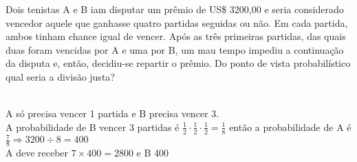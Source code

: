 \begin{ex}
  Dois tenistas A e B iam disputar um prêmio de US\$ 3200,00 e seria considerado vencedor aquele que ganhasse quatro partidas seguidas ou não. Em cada partida, ambos tinham chance igual de vencer. Após as três primeiras partidas, das quais duas foram vencidas por A e uma por B, um mau tempo impediu a continuação da disputa e, então, decidiu-se repartir o prêmio. Do ponto de vista probabilístico qual seria a divisão justa?
    \begin{sol}
      \phantom{A} \\
      A só precisa vencer 1 partida e B precisa vencer 3.\\
      A probabilidade de B vencer 3 partidas  é  $\frac{1}{2}\cdot\frac{1}{2}\cdot\frac{1}{2}=\frac{1}{8}$ então a probabilidade de A é $\frac{7}{8} \Longrightarrow3200 \div 8= 400$\\ A deve receber $7 \times 400=2800$ e B 400
      
    \end{sol}
\end{ex}